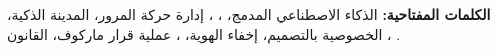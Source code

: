 \vspace{0.4cm}

\begin{tcolorbox}[
  colback  = LightGray,
  colframe = DarkGray,
  arc      = 3pt,
  boxrule  = 0.5pt
]
\begin{Arabic}
\textbf{الكلمات المفتاحية:}
الذكاء الاصطناعي المدمج،
،
،
إدارة حركة المرور،
المدينة الذكية،
الخصوصية بالتصميم،
إخفاء الهوية،
،
عملية قرار ماركوف،
القانون ،
.
\end{Arabic}
\end{tcolorbox}
\fi